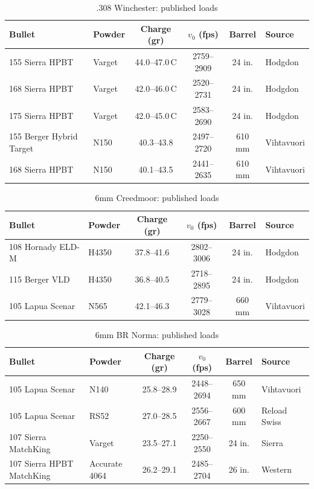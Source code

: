 \documentclass[11pt,twoside,openright]{report}
\begin{document}
\begin{table}[H]
\centering
\caption{.308 Winchester: published loads \citep{hodgdon2024,vihtavuori2026}}
\label{tab:308_loads}
\begin{tabular}{@{}llcccl@{}}
\toprule
\textbf{Bullet} & \textbf{Powder} & \textbf{Charge (gr)} & \textbf{$v_0$ (fps)} & \textbf{Barrel} & \textbf{Source} \\
\midrule
155 Sierra HPBT & Varget & 44.0--47.0\,C & 2759--2909 & 24 in. & Hodgdon \\
168 Sierra HPBT & Varget & 42.0--46.0\,C & 2520--2731 & 24 in. & Hodgdon \\
175 Sierra HPBT & Varget & 42.0--45.0\,C & 2583--2690 & 24 in. & Hodgdon \\
155 Berger Hybrid Target & N150 & 40.3--43.8 & 2497--2720 & 610 mm & Vihtavuori \\
168 Sierra HPBT & N150 & 40.1--43.5 & 2441--2635 & 610 mm & Vihtavuori \\
\bottomrule
\end{tabular}
\end{table}

\begin{table}[H]
\centering
\caption{6mm Creedmoor: published loads \citep{hodgdon2024,vihtavuori2026}}
\label{tab:6cm_loads}
\begin{tabular}{@{}llcccl@{}}
\toprule
\textbf{Bullet} & \textbf{Powder} & \textbf{Charge (gr)} & \textbf{$v_0$ (fps)} & \textbf{Barrel} & \textbf{Source} \\
\midrule
108 Hornady ELD-M & H4350 & 37.8--41.6 & 2802--3006 & 24 in. & Hodgdon \\
115 Berger VLD & H4350 & 36.8--40.5 & 2718--2895 & 24 in. & Hodgdon \\
105 Lapua Scenar & N565 & 42.1--46.3 & 2779--3028 & 660 mm & Vihtavuori \\
\bottomrule
\end{tabular}
\end{table}

\begin{table}[H]
\centering
\caption{6mm BR Norma: published loads \citep{vihtavuori2026,reloadswiss2025,sierra2020_6mmbr,western2020}}
\label{tab:6br_loads}
\small
\setlength{\tabcolsep}{4pt}
\begin{tabular}{@{}llcccl@{}}
\toprule
\textbf{Bullet} & \textbf{Powder} & \textbf{Charge (gr)} & \textbf{$v_0$ (fps)} & \textbf{Barrel} & \textbf{Source} \\
\midrule
105 Lapua Scenar & N140 & 25.8--28.9 & 2448--2694 & 650 mm & Vihtavuori \\
105 Lapua Scenar & RS52 & 27.0--28.5 & 2556--2667 & 600 mm & Reload Swiss \\
107 Sierra MatchKing & Varget & 23.5--27.1 & 2250--2550 & 24 in. & Sierra \\
107 Sierra HPBT MatchKing & Accurate 4064 & 26.2--29.1 & 2485--2704 & 26 in. & Western \\
\bottomrule
\end{tabular}
\end{table}
\end{document}
